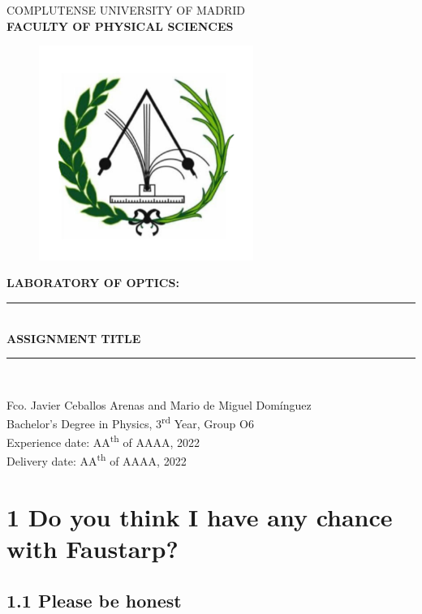 \documentclass[a4paper, 12pt]{article}
\newcommand\blankpage{%
	\null
	\thispagestyle{empty}%
	\addtocounter{page}{-1}%
	\newpage}
\begin{document}
	\begin{titlepage}
		\centering
		\vfill
		\Large{COMPLUTENSE UNIVERSITY OF MADRID \\ \textbf{FACULTY OF PHYSICAL SCIENCES}}
		\vfill
		\begin{figure}[h!]
			\centering
			\includegraphics[height=7cm]{cumphysics}
		\end{figure}
		\vfill 
		\textbf{\Large{LABORATORY OF OPTICS:}}
		\rule [5pt]{14cm}{2pt}\\
		\LARGE{\textbf{ASSIGNMENT TITLE}} \\
		\rule [8pt]{14cm}{2pt}\\
		\vfill
		\vfill
		\vfill
		\vfill
		
		\large{Fco. Javier Ceballos Arenas and Mario de Miguel Domínguez\\ Bachelor's Degree in Physics, 3\textsuperscript{rd} Year, Group O6\\ Experience date: AA\textsuperscript{th} of AAAA, 2022\\ Delivery date: AA\textsuperscript{th} of AAAA, 2022}
		\vfill
		\vfill
		\vfill
		\vfill
		
		\afterpage{\blankpage}
	\end{titlepage}
	
	\makeatletter
	\thispagestyle{empty}
	\addtocounter{page}{-1}
	\let\latexl@section\l@section
	\def\l@section#1#2{\begingroup\let\numberline\@gobble\latexl@section{#1}{#2}\endgroup}
	\let\latexl@subsection\l@subsection
	\def\l@subsection#1#2{\begingroup\let\numberline\@gobble\latexl@subsection{#1}{#2}\endgroup}
	\let\latexl@subsubsection\l@subsubsection
	\def\l@subsubsection#1#2{\begingroup\let\numberline\@gobble\latexl@subsubsection{#1}{#2}\endgroup}
	\makeatother
	\tableofcontents	
	\thispagestyle{empty}
	\afterpage{\blankpage}
	\newpage
\section{1 Do you think I have any chance with Faustarp?}
\subsection{1.1 Please be honest}
\end{document}
